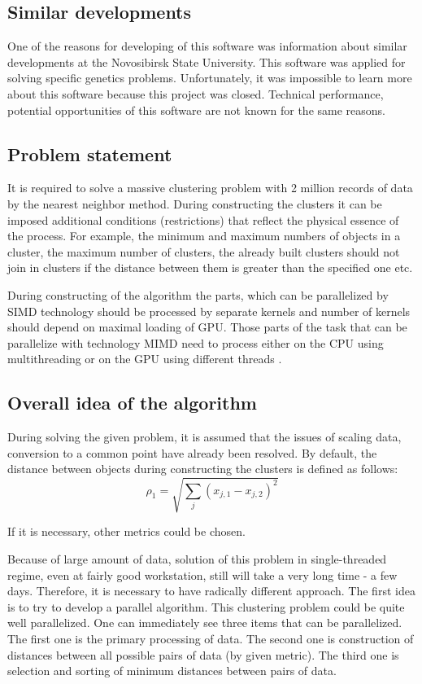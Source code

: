 \documentclass{TAACpaper}
\begin{document}
\subsection{Similar developments}
One of the reasons for developing of this software was information about similar developments at the Novosibirsk State University. This software was applied for solving specific genetics problems. Unfortunately, it was impossible to learn more about this software because this project was closed. Technical performance, potential opportunities of this software are not known for the same reasons.

\subsection{Problem statement}
It is required to solve a massive clustering problem with 2 million records of data by the nearest neighbor method. During constructing the clusters it can be imposed additional conditions (restrictions) that reflect the physical essence of the process. For example, the minimum and maximum numbers of objects in a cluster, the maximum number of clusters, the already built clusters should not join in clusters if the distance between them is greater than the specified one etc. 

During constructing of the algorithm the parts, which can be parallelized by SIMD technology should be processed by separate kernels and number of kernels should depend on maximal loading of GPU. Those parts of the task that can be parallelize with technology MIMD need to process either on the CPU using multithreading or on the GPU using different threads \cite{kepler}.

\subsection{Overall idea of the algorithm}
During solving the given problem, it is assumed that the issues of scaling data, conversion to a common point have already been resolved. By default, the distance between objects during constructing the clusters is defined as follows:
\begin{equation}
\rho_1 =\sqrt{ \sum_j (x_{j,1} - x_{j,2})^2}
\end{equation}

If it is necessary, other metrics could be chosen.

Because of large amount of data, solution of this problem in single-threaded regime, even at fairly good workstation, still will take a very long time - a few days. Therefore, it is necessary to have radically different approach. The first idea is to try to develop a parallel algorithm. This clustering problem could be quite well parallelized. One can immediately see three items that can be parallelized. The first one is the primary processing of data. The second one is construction of distances between all possible pairs of data (by given metric). The third one is selection and sorting of minimum distances between pairs of data.
\end{document}
